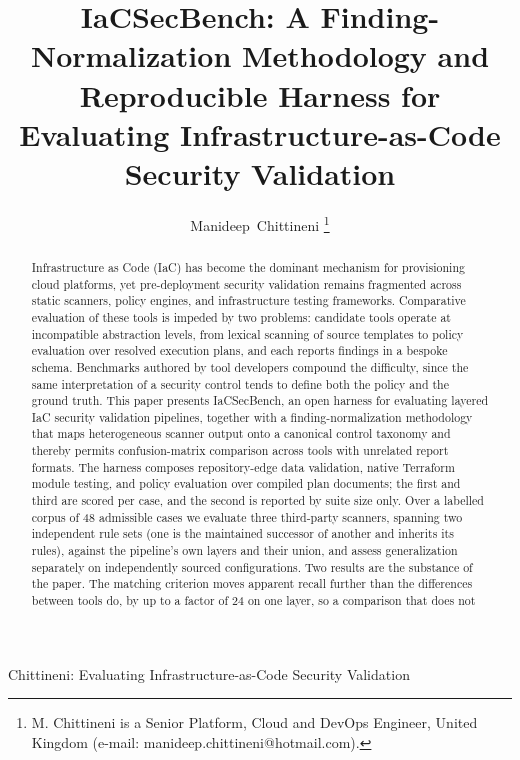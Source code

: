 \documentclass[journal]{IEEEtran}
\begin{document}
\title{IaCSecBench: A Finding-Normalization Methodology and Reproducible
Harness for Evaluating Infrastructure-as-Code Security Validation}

\author{Manideep~Chittineni%
\thanks{M. Chittineni is a Senior Platform, Cloud and DevOps Engineer,
United Kingdom (e-mail: manideep.chittineni@hotmail.com).}%
}

%
{Chittineni: Evaluating Infrastructure-as-Code Security Validation}

\maketitle

\begin{abstract}
Infrastructure as Code (IaC) has become the dominant mechanism for provisioning
cloud platforms, yet pre-deployment security validation remains fragmented across
static scanners, policy engines, and infrastructure testing frameworks.
Comparative evaluation of these tools is impeded by two problems: candidate tools
operate at incompatible abstraction levels, from lexical scanning of source
templates to policy evaluation over resolved execution plans, and each reports
findings in a bespoke schema. Benchmarks authored by tool developers compound the
difficulty, since the same interpretation of a security control tends to define
both the policy and the ground truth. This paper presents IaCSecBench, an open
harness for evaluating layered IaC security validation pipelines, together with
a finding-normalization methodology that maps heterogeneous scanner output onto a
canonical control taxonomy and thereby permits confusion-matrix comparison across
tools with unrelated report formats. The harness composes repository-edge data
validation, native Terraform module testing, and policy evaluation over compiled
plan documents; the first and third are scored per case, and the second is
reported by suite size only. Over a labelled corpus of 48 admissible cases we
evaluate three third-party scanners, spanning two independent rule sets (one is
the maintained successor of another and inherits its rules), against the
pipeline's own layers and their union, and assess generalization separately on
independently sourced configurations. Two results are the substance of the paper.
The matching criterion moves apparent recall further than the differences between
tools do, by up to a factor of 24 on one layer, so a comparison that does not

\end{abstract}
\end{document}
